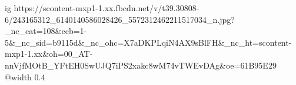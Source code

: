  
 
 
 
 

\ifcmt
  ig https://scontent-mxp1-1.xx.fbcdn.net/v/t39.30808-6/243165312_6140140586028426_5572312462211517034_n.jpg?_nc_cat=108&ccb=1-5&_nc_sid=b9115d&_nc_ohc=X7aDKPLqiN4AX9sBlFH&_nc_ht=scontent-mxp1-1.xx&oh=00_AT-nnVjfMOtB_YFtEH0SwUJQ7iPS2xakc8wM74vTWEvDAg&oe=61B95E29
  @width 0.4
\fi
